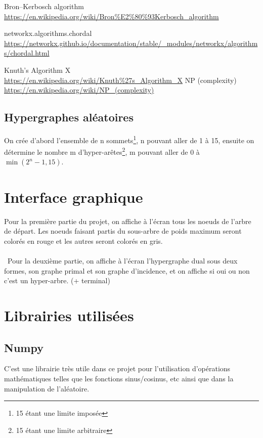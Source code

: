 \documentclass{article}
\begin{document}
\cite{Algo3}

\begin{thebibliography}{9}

Bron–Kerbosch algorithm
\\\url{https://en.wikipedia.org/wiki/Bron%E2%80%93Kerbosch_algorithm}

networkx.algorithms.chordal
\\\url{https://networkx.github.io/documentation/stable/_modules/networkx/algorithms/chordal.html}

Knuth's Algorithm X
\\\url{https://en.wikipedia.org/wiki/Knuth%27s_Algorithm_X}
NP (complexity)
\\\url{https://en.wikipedia.org/wiki/NP_(complexity)}

\end{thebibliography}
		
	
	\subsection{Hypergraphes aléatoires}
	On crée d'abord l'ensemble de n sommets\footnote{15 étant une limite imposée}, n pouvant aller de 1 à 15, ensuite on détermine le nombre m d'hyper-arêtes\footnote{15 étant une limite arbitraire}, m pouvant aller de 0 à $\min(2^n-1,15)$.

\section{Interface graphique}
	Pour la première partie du projet, on affiche à l'écran tous les noeuds de l'arbre de départ. Les noeuds faisant partis du sous-arbre de poids maximum seront colorés en rouge et les autres seront colorés en gris.\\\ \\\ Pour la deuxième partie, on affiche à l'écran l'hypergraphe dual sous deux formes, son graphe primal et son graphe d'incidence, et on affiche si oui ou non c'est un hyper-arbre. (+ terminal)

\section{Librairies utilisées}

	\subsection{Numpy}
		C'est une librairie très utile dans ce projet pour l'utilisation d'opérations mathématiques telles que les fonctions sinus/cosinus, etc ainsi que dans la manipulation de l'aléatoire.
\end{document}
